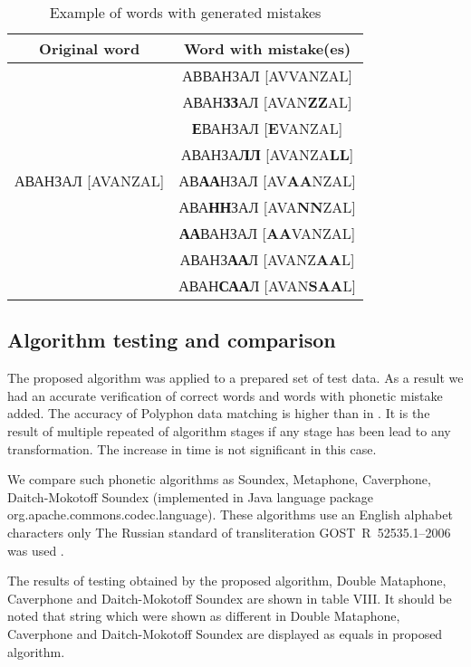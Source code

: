 \documentclass[conference,a4paper]{IEEEtran}
\begin{document}
\begin{table}[t!]
\renewcommand{\arraystretch}{1.3}
\caption{Example of words with generated mistakes}
\label{lbl-enterr}
\centering
\begin{tabular}{|c|c|}
\hline
Original word & Word with mistake(es)\\
\hline
\multirow{9}{*}{АВАНЗАЛ [AVANZAL]} & АВВАНЗАЛ [AVVANZAL] \\ 
\cline{2-2}
	& АВАН\textbf{ЗЗ}АЛ [AVAN\textbf{ZZ}AL] \\
\cline{2-2}
	& \textbf{Е}ВАНЗАЛ [\textbf{E}VANZAL] \\
\cline{2-2}
	& АВАНЗА\textbf{ЛЛ} [AVANZA\textbf{LL}] \\
\cline{2-2}
	& АВ\textbf{АА}НЗАЛ [AV\textbf{AA}NZAL] \\
\cline{2-2}
	& АВА\textbf{НН}ЗАЛ [AVA\textbf{NN}ZAL] \\
\cline{2-2}
	& \textbf{АА}ВАНЗАЛ [\textbf{AA}VANZAL] \\
\cline{2-2}
	& АВАНЗ\textbf{АА}Л [AVANZ\textbf{AA}L] \\
\cline{2-2}
	& АВАН\textbf{САА}Л [AVAN\textbf{SAA}L] \\    
\hline
\end{tabular}
\end{table}


\subsection{Algorithm testing and comparison}
The proposed algorithm was applied to a prepared set of test data. As a result we had an accurate verification of correct words and words with phonetic mistake added. The accuracy of Polyphon data matching is higher than in \cite{Paramonov-2016}. It is the result of multiple repeated of algorithm stages if any stage  has been lead to any transformation. The increase in time is not significant in this case.

We compare such phonetic algorithms as Soundex, Metaphone, Caverphone, Daitch-Mokotoff Soundex (implemented in Java language package org.apache.commons.codec.language). These algorithms use an English alphabet characters only The Russian standard of transliteration GOST~R~52535.1--2006 was used \cite{GOST-2006}.

The results of testing obtained by the proposed algorithm, Double Mataphone, Caverphone and Daitch-Mokotoff Soundex  are shown in table VIII. It should be noted that string which were shown as different in Double Mataphone, Caverphone and Daitch-Mokotoff Soundex are  displayed as equals in proposed algorithm. 
\end{document}
